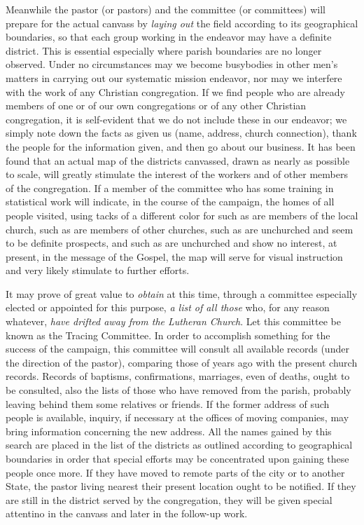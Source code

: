 \documentclass[
]{book}
\begin{document}
Meanwhile the pastor (or pastors) and the committee (or committees) will prepare for the actual canvass by \emph{laying out} the field according to its geographical boundaries, so that each group working in the endeavor may have a definite district. This is essential especially where parish boundaries are no longer observed. Under no circumstances may we become busybodies in other men's matters in carrying out our systematic mission endeavor, nor may we interfere with the work of any Christian congregation. If we find people who are already members of one or of our own congregations or of any other Christian congregation, it is self-evident that we do not include these in our endeavor; we simply note down the facts as given us (name, address, church connection), thank the people for the information given, and then go about our business. It has been found that an actual map of the districts canvassed, drawn as nearly as possible to scale, will greatly stimulate the interest of the workers and of other members of the congregation. If a member of the committee who has some training in statistical work will indicate, in the course of the campaign, the homes of all people visited, using tacks of a different color for such as are members of the local church, such as are members of other churches, such as are unchurched and seem to be definite prospects, and such as are unchurched and show no interest, at present, in the message of the Gospel, the map will serve for visual instruction and very likely stimulate to further efforts.

It may prove of great value to \emph{obtain} at this time, through a committee especially elected or appointed for this purpose, \emph{a list of all those} who, for any reason whatever, \emph{have drifted away from the Lutheran Church}. Let this committee be known as the Tracing Committee. In order to accomplish something for the success of the campaign, this committee will consult all available records (under the direction of the pastor), comparing those of years ago with the present church records. Records of baptisms, confirmations, marriages, even of deaths, ought to be consulted, also the lists of those who have removed from the parish, probably leaving behind them some relatives or friends. If the former address of such people is available, inquiry, if necessary at the offices of moving companies, may bring information concerning the new address. All the names gained by this search are placed in the list of the districts as outlined according to geographical boundaries in order that special efforts may be concentrated upon gaining these people once more. If they have moved to remote parts of the city or to another State, the pastor living nearest their present location ought to be notified. If they are still in the district served by the congregation, they will be given special attentino in the canvass and later in the follow-up work.
\end{document}
